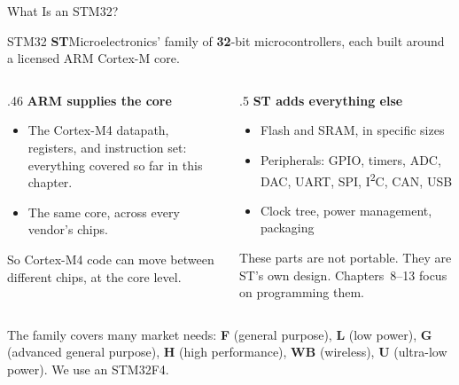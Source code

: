 \documentclass[9pt,aspectratio=169,xcolor=table]{beamer}
\begin{document}
\begin{frame}{What Is an STM32?}
    \begin{block}{STM32}
        \textbf{ST}Microelectronics' family of \textbf{32}-bit microcontrollers, each built around a licensed \alert{ARM Cortex-M} core.
    \end{block}
    \vspace{2mm}
    \begin{columns}[T]
    \begin{column}{.46\textwidth}
        \textbf{ARM supplies the core}
        \begin{itemize}
            \item The Cortex-M4 datapath, registers, and instruction set: everything covered so far in this chapter.
            \item The same core, across every vendor's chips.
        \end{itemize}
        \vspace{1mm}
        {\small So Cortex-M4 code can move between different chips, at the core level.}
    \end{column}
    \begin{column}{.5\textwidth}
        \textbf{ST adds everything else}
        \begin{itemize}
            \item Flash and SRAM, in specific sizes
            \item Peripherals: GPIO, timers, ADC, DAC, UART, SPI, I\textsuperscript{2}C, CAN, USB
            \item Clock tree, power management, packaging
        \end{itemize}
        \vspace{1mm}
        {\small These parts are \alert{not} portable. They are ST's own design. Chapters~8--13 focus on programming them.}
    \end{column}
    \end{columns}
    \vspace{2mm}
    {\small The family covers many market needs: \textbf{F} (general purpose), \textbf{L} (low power), \textbf{G} (advanced general purpose), \textbf{H} (high performance), \textbf{WB} (wireless), \textbf{U} (ultra-low power). We use an \alert{STM32F4}.}
\end{frame}
\end{document}
